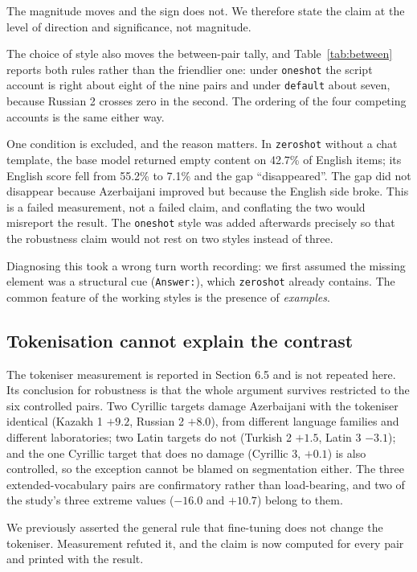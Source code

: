 \documentclass[final]{clv2025}
\begin{document}
The magnitude moves and the sign does not. We therefore state the claim at the
level of direction and significance, not magnitude.

The choice of style also moves the between-pair tally, and
Table~\ref{tab:between} reports both rules rather than the friendlier one:
under \texttt{oneshot} the script account is right about eight of the nine
pairs and under \texttt{default} about seven, because Russian 2 crosses zero in
the second. The ordering of the four competing accounts is the same either way.

One condition is excluded, and the reason matters. In \texttt{zeroshot} without
a chat template, the base model returned empty content on 42.7\% of English
items; its English score fell from 55.2\% to 7.1\% and the gap ``disappeared''.
The gap did not disappear because Azerbaijani improved but because the English
side broke. This is a failed measurement, not a failed claim, and conflating
the two would misreport the result. The \texttt{oneshot} style was added
afterwards precisely so that the robustness claim would not rest on two styles
instead of three.

Diagnosing this took a wrong turn worth recording: we first assumed the missing
element was a structural cue (\texttt{Answer:}), which \texttt{zeroshot}
already contains. The common feature of the working styles is the presence of
\emph{examples}.

\subsection{Tokenisation cannot explain the contrast}

The tokeniser measurement is reported in Section 6.5 and is not repeated here.
Its conclusion for robustness is that the whole argument survives restricted to
the six controlled pairs. Two Cyrillic targets damage Azerbaijani with the
tokeniser identical (Kazakh 1 $+9.2$, Russian 2 $+8.0$), from different
language families and different laboratories; two Latin targets do not
(Turkish 2 $+1.5$, Latin 3 $-3.1$); and the one Cyrillic target that does no
damage (Cyrillic 3, $+0.1$) is also controlled, so the exception cannot be
blamed on segmentation either. The three extended-vocabulary pairs are
confirmatory rather than load-bearing, and two of the study's three extreme
values ($-16.0$ and $+10.7$) belong to them.

We previously asserted the general rule that fine-tuning does not change the
tokeniser. Measurement refuted it, and the claim is now computed for every pair
and printed with the result.
\end{document}
